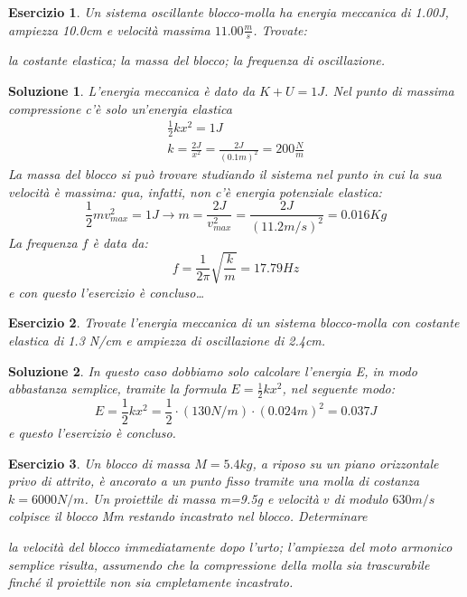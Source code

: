 \documentclass{article}
\newtheorem{es}{Esercizio}[section]
\newtheorem{sol}{Soluzione}[section]
\begin{document}
\begin{es}
  Un sistema oscillante blocco-molla ha energia meccanica di 1.00J, ampiezza 10.0cm e velocità massima $11.00\frac{m}{s}$. Trovate:
  \begin{tasks}
    \task la costante elastica;
    \task la massa del blocco;
    \task la frequenza di oscillazione.
  \end{tasks}
\end{es}
\begin{sol}
  L'energia meccanica è dato da $K+U=1J$. Nel punto di massima compressione c'è solo un'energia elastica
  \begin{equation*}
    \begin{matrix}
      \frac{1}{2}kx^2=1J\\
      k=\frac{2J}{x^2}=\frac{2J}{(0.1m)^2}=\boxed{200\frac{N}{m}}
    \end{matrix}
  \end{equation*}
  La massa del blocco si può trovare studiando il sistema nel punto in cui la sua velocità è massima: qua, infatti, non c'è energia potenziale elastica:
  \begin{equation*}
    \frac{1}{2}mv^2_{max}=1J \to m=\frac{2J}{v^2_{max}}=\frac{2J}{(11.2m/s)^2}=\boxed{0.016}Kg
    \end{equation*}
    La frequenza $f$ è data da:
    \begin{equation*}
      f=\frac{1}{2\pi}\sqrt{\frac{k}{m}}=\boxed{17.79Hz}
    \end{equation*}
    e con questo l'esercizio è concluso\dots
\end{sol}
\begin{es}
  Trovate l'energia meccanica di un sistema blocco-molla con costante elastica di 1.3 N/cm e ampiezza di oscillazione di 2.4cm.
\end{es}
\begin{sol}
  In questo caso dobbiamo solo calcolare l'energia E, in modo abbastanza semplice, tramite la formula $E=\frac{1}{2}kx^2$, nel seguente modo:
  \begin{equation*}
    E=\frac{1}{2}kx^2=\frac{1}{2}\cdot(130N/m)\cdot(0.024m)^2=0.037J
  \end{equation*}
  e questo l'esercizio è concluso.
\end{sol}
\begin{es}
  Un blocco di massa $M=5.4kg$, a riposo su un piano orizzontale privo di attrito, è ancorato a un punto fisso tramite una molla di costanza $k=6000N/m$. Un proiettile di massa m=9.5g e velocità $v$ di modulo $630m/s$ colpisce il blocco Mm restando incastrato nel blocco. Determinare
  \begin{tasks}
    \task la velocità del blocco immediatamente dopo l'urto;
    \task l'ampiezza del moto armonico semplice risulta, assumendo che la compressione della molla sia trascurabile finché il proiettile non sia cmpletamente incastrato.
  \end{tasks}
\end{es}
\end{document}
